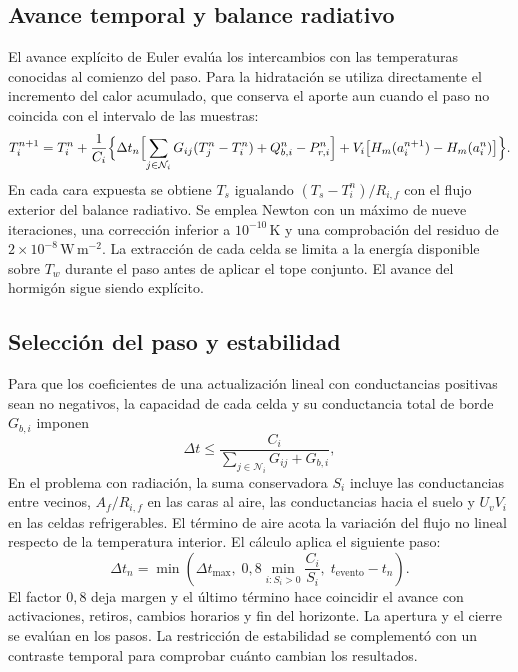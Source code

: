 \subsection{Avance temporal y balance radiativo}
El avance explícito de Euler evalúa los intercambios con las temperaturas conocidas al comienzo del paso. Para la hidratación se utiliza directamente el incremento del calor acumulado, que conserva el aporte aun cuando el paso no coincida con el intervalo de las muestras:
\begin{equation}
  T_i^{n+1}=T_i^n+\frac{1}{C_i}\Bigl\{\Delta t_n\Bigl[\sum_{j\in\mathcal N_i}G_{ij}(T_j^n-T_i^n)+Q_{b,i}^n-P_{r,i}^n\Bigr]+V_i\bigl[H_m(a_i^{n+1})-H_m(a_i^n)\bigr]\Bigr\}.
  \label{eq:euler-fundacion}
\end{equation}
En cada cara expuesta se obtiene $T_s$ igualando $(T_s-T_i^n)/R_{i,f}$ con el flujo exterior del balance radiativo. Se emplea Newton con un máximo de nueve iteraciones, una corrección inferior a $10^{-10}\,\mathrm K$ y una comprobación del residuo de $2\times10^{-8}\,\mathrm{W\,m^{-2}}$. La extracción de cada celda se limita a la energía disponible sobre $T_w$ durante el paso antes de aplicar el tope conjunto. El avance del hormigón sigue siendo explícito.

\subsection{Selección del paso y estabilidad}
Para que los coeficientes de una actualización lineal con conductancias positivas sean no negativos, la capacidad de cada celda y su conductancia total de borde $G_{b,i}$ imponen
\begin{equation}
  \Delta t\leq
  \frac{C_i}{\displaystyle\sum_{j\in\mathcal N_i}G_{ij}+G_{b,i}},
  \label{eq:limite-lineal}
\end{equation}
En el problema con radiación, la suma conservadora $S_i$ incluye las conductancias entre vecinos, $A_f/R_{i,f}$ en las caras al aire, las conductancias hacia el suelo y $U_vV_i$ en las celdas refrigerables. El término de aire acota la variación del flujo no lineal respecto de la temperatura interior. El cálculo aplica el siguiente paso:
\begin{equation}
  \Delta t_n=\min\left(
     \Delta t_{\max},\;
     0{,}8\min_{i:S_i>0}\frac{C_i}{S_i},\;
     t_{\mathrm{evento}}-t_n\right).
  \label{eq:paso-utilizado}
\end{equation}
El factor $0{,}8$ deja margen y el último término hace coincidir el avance con activaciones, retiros, cambios horarios y fin del horizonte. La apertura y el cierre se evalúan en los pasos. La restricción de estabilidad se complementó con un contraste temporal para comprobar cuánto cambian los resultados.

